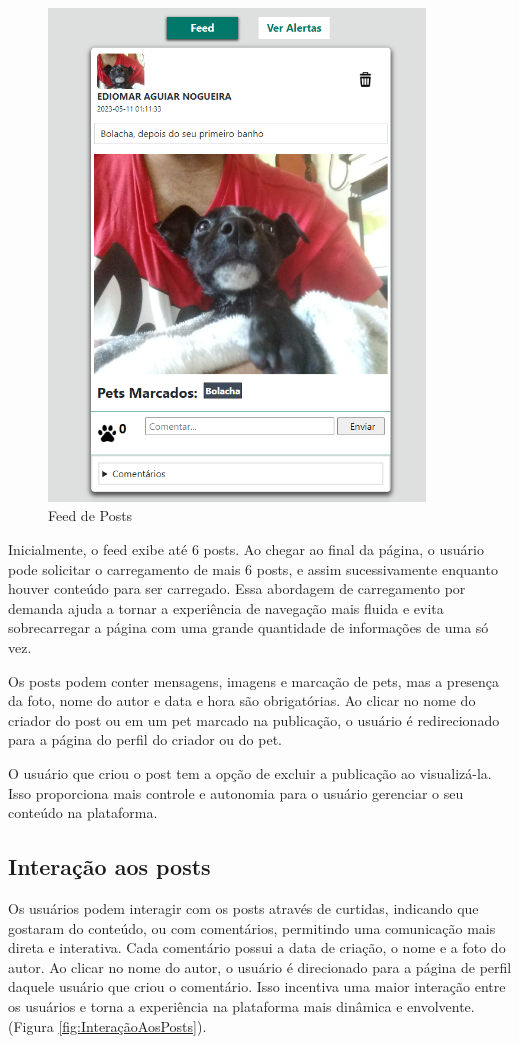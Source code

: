 \begin{figure}[htb]
     \centering
     \includegraphics[width=10cm]{arquivos/Figuras/image17.png}
     \caption{Feed de Posts}
     \label{fig:FeedDePosts}
\end{figure}

Inicialmente, o feed exibe até 6 posts. Ao chegar ao final da página, o usuário pode solicitar o carregamento de mais 6 posts, e assim sucessivamente enquanto houver conteúdo para ser carregado. Essa abordagem de carregamento por demanda ajuda a tornar a experiência de navegação mais fluida e evita sobrecarregar a página com uma grande quantidade de informações de uma só vez.

Os posts podem conter mensagens, imagens e marcação de pets, mas a presença da foto, nome do autor e data e hora são obrigatórias. Ao clicar no nome do criador do post ou em um pet marcado na publicação, o usuário é redirecionado para a página do perfil do criador ou do pet.

O usuário que criou o post tem a opção de excluir a publicação ao visualizá-la. Isso proporciona mais controle e autonomia para o usuário gerenciar o seu conteúdo na plataforma.

\subsection{Interação aos posts}
Os usuários podem interagir com os posts através de curtidas, indicando que gostaram do conteúdo, ou com comentários, permitindo uma comunicação mais direta e interativa. Cada comentário possui a data de criação, o nome e a foto do autor. Ao clicar no nome do autor, o usuário é direcionado para a página de perfil daquele usuário que criou o comentário. Isso incentiva uma maior interação entre os usuários e torna a experiência na plataforma mais dinâmica e envolvente. (Figura \ref{fig:InteraçãoAosPosts}).

